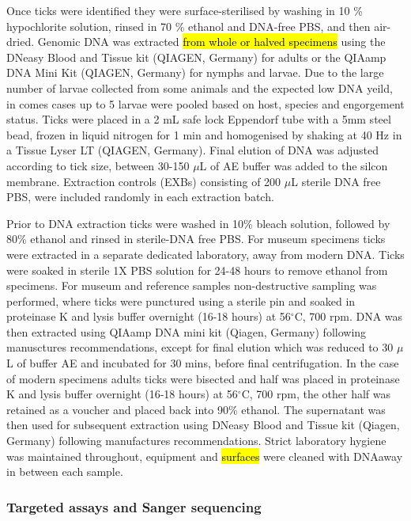 \documentclass[a4paper, nobind]{templates/ociamthesis}
\begin{document}
Once ticks were identified they were surface-sterilised by washing in 10 \% hypochlorite solution, rinsed in 70 \% ethanol and DNA-free PBS, and then air-dried. Genomic DNA was extracted \hl{from whole or halved specimens} using the DNeasy Blood and Tissue kit (QIAGEN, Germany) for adults or the QIAamp DNA Mini Kit (QIAGEN, Germany) for nymphs and larvae.
Due to the large number of larvae collected from some animals and the expected low DNA yeild, in comes cases up to 5 larvae were pooled based on host, species and engorgement status.
Ticks were placed in a 2 mL safe lock Eppendorf tube with a 5mm steel bead, frozen in liquid nitrogen for 1 min and homogenised by shaking at 40 Hz in a Tissue Lyser LT (QIAGEN, Germany). Final elution of DNA was adjusted according to tick size, between 30-150 \(\mu\)L of AE buffer was added to the silcon membrane.
Extraction controls (EXBs) consisting of 200 \(\mu\)L sterile DNA free PBS, were included randomly in each extraction batch.

Prior to DNA extraction ticks were washed in 10\% bleach solution, followed by 80\% ethanol and rinsed in sterile-DNA free PBS. For museum specimens ticks were extracted in a separate dedicated laboratory, away from modern DNA. Ticks were soaked in sterile 1X PBS solution for 24-48 hours to remove ethanol from specimens. For museum and reference samples non-destructive sampling was performed, where ticks were punctured using a sterile pin and soaked in proteinase K and lysis buffer overnight (16-18 hours) at 56\(^\circ\)C, 700 rpm.
DNA was then extracted using QIAamp DNA mini kit (Qiagen, Germany) following manusctures recommendations, except for final elution which was reduced to 30 \(\mu\)L of buffer AE and incubated for 30 mins, before final centrifugation.
In the case of modern specimens adults ticks were bisected and half was placed in proteinase K and lysis buffer overnight (16-18 hours) at 56\(^\circ\)C, 700 rpm, the other half was retained as a voucher and placed back into 90\% ethanol.
The supernatant was then used for subsequent extraction using DNeasy Blood and Tissue kit (Qiagen, Germany) following manufactures recommendations. Strict laboratory hygiene was maintained throughout, equipment and \hl{surfaces} were cleaned with DNAaway in between each sample.

\hypertarget{targeted-assays-and-sanger-sequencing}{%
\subsubsection{Targeted assays and Sanger sequencing}\label{targeted-assays-and-sanger-sequencing}}
\end{document}
